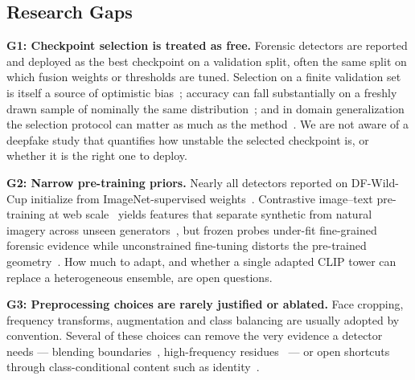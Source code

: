 \documentclass[10pt,journal]{IEEEtran}
\begin{document}
\subsection{Research Gaps}
\textbf{G1: Checkpoint selection is treated as free.} Forensic detectors are
reported and deployed as the best checkpoint on a validation split, often the
same split on which fusion weights or thresholds are tuned. Selection on a
finite validation set is itself a source of optimistic
bias~\cite{cawley2010overfitting,varma2006bias}; accuracy can fall
substantially on a freshly drawn sample of nominally the same
distribution~\cite{recht2019imagenet}; and in domain generalization the
selection protocol can matter as much as the method~\cite{gulrajani2021lostdg}.
We are not aware of a deepfake study that quantifies how unstable the selected
checkpoint is, or whether it is the right one to deploy.

\textbf{G2: Narrow pre-training priors.} Nearly all detectors reported on
DF-Wild-Cup initialize from ImageNet-supervised
weights~\cite{deng2009imagenet}. Contrastive image--text pre-training at web
scale~\cite{radford2021clip,cherti2023openclip,schuhmann2022laion5b} yields
features that separate synthetic from natural imagery across unseen
generators~\cite{ojha2023universal,cozzolino2024raising,khan2024clipping}, but
frozen probes under-fit fine-grained forensic evidence while unconstrained
fine-tuning distorts the pre-trained geometry~\cite{kumar2022finetuning}. How
much to adapt, and whether a single adapted CLIP tower can replace a
heterogeneous ensemble, are open questions.

\textbf{G3: Preprocessing choices are rarely justified or ablated.} Face
cropping, frequency transforms, augmentation and class balancing are usually
adopted by convention. Several of these choices can remove the very evidence a
detector needs --- blending boundaries~\cite{li2020facexray,shiohara2022sbi},
high-frequency residues~\cite{durall2020upconvolution} --- or open shortcuts
through class-conditional content such as identity~\cite{dong2023identityleakage}.
\end{document}
